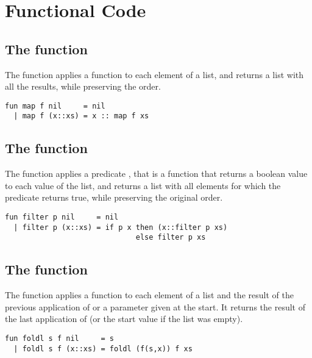 

\newpage

\section{Functional Code}
\label{sect:appendix_functional}

\subsection{The  function}
\label{code:map}
The function  applies a function  to each element of a list, and returns a list with all the results, while preserving the order. \\
\lstset{language=ml}
\begin{lstlisting}
fun map f nil     = nil
  | map f (x::xs) = x :: map f xs
\end{lstlisting} 

\subsection{The  function}
\label{code:filter}
The function  applies a predicate , that is a function that returns a boolean value to each value of the list, and returns a list with all elements for which the predicate returns true, while preserving the original order. \\
\lstset{language=ml}
\begin{lstlisting}
fun filter p nil     = nil
  | filter p (x::xs) = if p x then (x::filter p xs) 
                              else filter p xs
\end{lstlisting} 


\subsection{The  function}
\label{code:foldl}
The function  applies a function  to each element of a list and the result of the previous application of  or a parameter given at the start. It returns the result of the last application of  (or the start value if the list was empty). \\
\lstset{language=ml}
\begin{lstlisting}
fun foldl s f nil     = s
  | foldl s f (x::xs) = foldl (f(s,x)) f xs
\end{lstlisting} 

